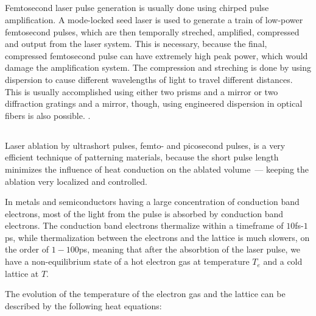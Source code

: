     \subsection{}
            Femtosecond laser pulse generation is usually done using chirped pulse amplification. A mode-locked seed laser is used
        to generate a train of low-power femtosecond pulses, which are then temporally streched, amplified, compressed and output
        from the laser system. This is necessary, because the final, compressed femtosecond pulse can have extremely high peak power,
        which would damage the amplification system\cite{harilal2014femtosecond}.
            The compression and streching is done by using dispersion to cause different wavelengths of light to travel different distances.
        This is usually accomplished using either two prisms and a mirror or two diffraction gratings and a mirror, though, using engineered
        dispersion in optical fibers is also possible\cite{harilal2014femtosecond}.
            .

    \subsection{}
            Laser ablation by ultrashort pulses, femto- and picosecond pulses, is a very efficient technique of patterning materials, because
        the short pulse length minimizes the influence of heat conduction on the ablated volume~--- keeping the ablation very localized and
        controlled.

            In metals and semiconductors having a large concentration of conduction band electrons, most of the light from the pulse is
        absorbed by conduction band electrons. The conduction band electrons thermalize within a timeframe of $10$fs-$1$ps, while thermalization
        between the electrons and the lattice is much slowers, on the order of $1-100$ps, meaning that after the absorbtion of the laser pulse,
        we have a non-equilibrium state of a hot electron gas at temperature $T_e$ and a cold lattice at $T$. \cite{bauerle2013laser}

        The evolution of the temperature of the electron gas and the lattice can be described by the following heat equations:

